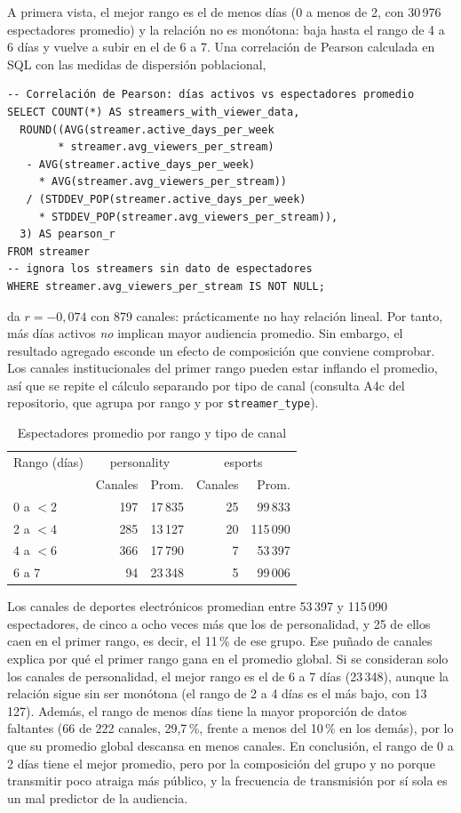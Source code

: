 \documentclass[conference]{IEEEtran}
\begin{document}
A primera vista, el mejor rango es el de menos días (0 a menos de 2, con 30\,976 espectadores promedio) y la relación no es monótona: baja hasta el rango de 4 a 6 días y vuelve a subir en el de 6 a 7. Una correlación de Pearson calculada en SQL con las medidas de dispersión poblacional,
\begin{lstlisting}
-- Correlación de Pearson: días activos vs espectadores promedio
SELECT COUNT(*) AS streamers_with_viewer_data,
  ROUND((AVG(streamer.active_days_per_week
        * streamer.avg_viewers_per_stream)
   - AVG(streamer.active_days_per_week)
     * AVG(streamer.avg_viewers_per_stream))
   / (STDDEV_POP(streamer.active_days_per_week)
     * STDDEV_POP(streamer.avg_viewers_per_stream)),
  3) AS pearson_r
FROM streamer
-- ignora los streamers sin dato de espectadores
WHERE streamer.avg_viewers_per_stream IS NOT NULL;
\end{lstlisting}
da $r=-0{,}074$ con 879 canales: prácticamente no hay relación lineal. Por tanto, más días activos \emph{no} implican mayor audiencia promedio. Sin embargo, el resultado agregado esconde un efecto de composición que conviene comprobar. Los canales institucionales del primer rango pueden estar inflando el promedio, así que se repite el cálculo separando por tipo de canal (consulta A4c del repositorio, que agrupa por rango y por \texttt{streamer\_type}).
\begin{table}[!h]
\caption{Espectadores promedio por rango y tipo de canal}
\centering\footnotesize
\begin{tabular}{@{}lrrrr@{}}
\toprule
Rango (días) & \multicolumn{2}{c}{personality} & \multicolumn{2}{c}{esports} \\
 & Canales & Prom. & Canales & Prom. \\
\midrule
0 a $<$2 & 197 & 17\,835 & 25 & 99\,833 \\
2 a $<$4 & 285 & 13\,127 & 20 & 115\,090 \\
4 a $<$6 & 366 & 17\,790 & 7 & 53\,397 \\
6 a 7 & 94 & 23\,348 & 5 & 99\,006 \\
\bottomrule
\end{tabular}
\end{table}
Los canales de deportes electrónicos promedian entre 53\,397 y 115\,090 espectadores, de cinco a ocho veces más que los de personalidad, y 25 de ellos caen en el primer rango, es decir, el 11\,\% de ese grupo. Ese puñado de canales explica por qué el primer rango gana en el promedio global. Si se consideran solo los canales de personalidad, el mejor rango es el de 6 a 7 días (23\,348), aunque la relación sigue sin ser monótona (el rango de 2 a 4 días es el más bajo, con 13\,127). Además, el rango de menos días tiene la mayor proporción de datos faltantes (66 de 222 canales, 29,7\,\%, frente a menos del 10\,\% en los demás), por lo que su promedio global descansa en menos canales. En conclusión, el rango de 0 a 2 días tiene el mejor promedio, pero por la composición del grupo y no porque transmitir poco atraiga más público, y la frecuencia de transmisión por sí sola es un mal predictor de la audiencia.
\end{document}
